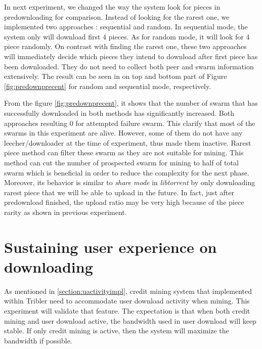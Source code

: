 
In next experiment, we changed the way the system look for pieces in predownloading for comparison. Instead of looking for the rarest one, we implemented two approaches : sequential and random. In sequential mode, the system only will download first 4 pieces. As for random mode, it will look for 4 piece randomly. On contrast with finding the rarest one, these two approaches will immediately decide which pieces they intend to download after first piece has been downloaded. They do not need to collect both peer and swarm information extensively. The result can be seen in on top and bottom part of Figure \ref{fig:predownprecent} for random and sequential mode, respectively. 

From the figure \ref{fig:predownprecent}, it shows that the number of swarm that has successfully downloaded in both methods has significantly increased. Both approaches resulting 0 for attempted failure swarm. This clarify that most of the swarms in this experiment are alive. However, some of them do not have any leecher/downloader at the time of experiment, thus made them inactive. Rarest piece method can filter these swarm as they are not suitable for mining. This method can cut the number of prospected swarm for mining to half of total swarm which is beneficial in order to reduce the complexity for the next phase. Moreover, its behavior is similar to \textit{share mode} in \textit{libtorrent} by only downloading rarest piece that we will be able to upload in the future. In fact, just after predownload finished, the upload ratio may be very high because of the piece rarity as shown in previous experiment. 

\section{Sustaining user experience on downloading}
\label{section:expprio}
As mentioned in \ref{section:uactivityimpl}, credit mining system that implemented within Tribler need to accommodate user download activity when mining. This experiment will validate that feature. The expectation is that when both credit mining and user download active, the bandwidth used in user download will keep stable. If only credit mining is active, then the system will maximize the bandwidth if possible. 

